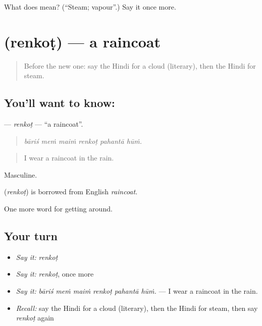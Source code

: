 \begin{tcolorbox}[breakable,colback=teal!4,colframe=teal!35!black,title={Before you move on}]
What does  mean? (\textquotedblleft{}Steam; vapour\textquotedblright{}.) Say it once more.
\end{tcolorbox}
\section[\texorpdfstring{\hi{रेनकोट} (renkoṭ)}{रेनकोट (renkoṭ)}]{ (renkoṭ) — a raincoat}

\label{lesson:HI-C436-renkot}



\begin{quote}
Before the new one: say the Hindi for a cloud (literary), then the Hindi for steam.
\end{quote}

\subsection*{You'll want to know: }
\textbf{} — \emph{renkoṭ} — \textquotedblleft{}a raincoat\textquotedblright{}.

\begin{quote}
     
\end{quote}

\begin{quote}
\emph{bāriś meṁ maiṁ renkoṭ pahantā hūṁ.}
\end{quote}

\begin{quote}
I wear a raincoat in the rain.
\end{quote}

Masculine.

\begin{cousinweb}
\textbf{} (\emph{renkoṭ}) is borrowed from English \emph{raincoat}.
\end{cousinweb}

\begin{grammarlens}[title={What you've built}]
One more word for getting around.
\end{grammarlens}

\subsection*{Your turn}
\begin{itemize}
\raggedright
  \item \emph{Say it:} \emph{renkoṭ}
  \item \emph{Say it:} \emph{renkoṭ}, once more
  \item \emph{Say it:} \emph{bāriś meṁ maiṁ renkoṭ pahantā hūṁ.} — I wear a raincoat in the rain.
  \item \emph{Recall:} say the Hindi for a cloud (literary), then the Hindi for steam, then say \emph{renkoṭ} again
\end{itemize}

